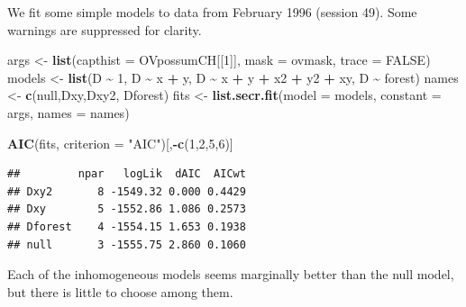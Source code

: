 \documentclass[
]{book}
\newenvironment{Shaded}{\begin{snugshade}}{\end{snugshade}}
\newcommand{\AttributeTok}[1]{\textcolor[rgb]{0.13,0.29,0.53}{#1}}
\newcommand{\ConstantTok}[1]{\textcolor[rgb]{0.56,0.35,0.01}{#1}}
\newcommand{\DecValTok}[1]{\textcolor[rgb]{0.00,0.00,0.81}{#1}}
\newcommand{\FunctionTok}[1]{\textcolor[rgb]{0.13,0.29,0.53}{\textbf{#1}}}
\newcommand{\NormalTok}[1]{#1}
\newcommand{\OtherTok}[1]{\textcolor[rgb]{0.56,0.35,0.01}{#1}}
\newcommand{\SpecialCharTok}[1]{\textcolor[rgb]{0.81,0.36,0.00}{\textbf{#1}}}
\newcommand{\StringTok}[1]{\textcolor[rgb]{0.31,0.60,0.02}{#1}}
\begin{document}
We fit some simple models to data from February 1996 (session 49). Some warnings
are suppressed for clarity.

\begin{Shaded}
\begin{Highlighting}[]
\NormalTok{args }\OtherTok{\textless{}{-}} \FunctionTok{list}\NormalTok{(}\AttributeTok{capthist =}\NormalTok{ OVpossumCH[[}\DecValTok{1}\NormalTok{]], }\AttributeTok{mask =}\NormalTok{ ovmask, }\AttributeTok{trace =} 
    \ConstantTok{FALSE}\NormalTok{)}
\NormalTok{models }\OtherTok{\textless{}{-}} \FunctionTok{list}\NormalTok{(D }\SpecialCharTok{\textasciitilde{}} \DecValTok{1}\NormalTok{, D }\SpecialCharTok{\textasciitilde{}}\NormalTok{ x }\SpecialCharTok{+}\NormalTok{ y, D }\SpecialCharTok{\textasciitilde{}}\NormalTok{ x }\SpecialCharTok{+}\NormalTok{ y }\SpecialCharTok{+}\NormalTok{ x2 }\SpecialCharTok{+}\NormalTok{ y2 }\SpecialCharTok{+}\NormalTok{ xy, }
\NormalTok{    D }\SpecialCharTok{\textasciitilde{}}\NormalTok{ forest)}
\NormalTok{names }\OtherTok{\textless{}{-}} \FunctionTok{c}\NormalTok{(}\StringTok{\textquotesingle{}null\textquotesingle{}}\NormalTok{,}\StringTok{\textquotesingle{}Dxy\textquotesingle{}}\NormalTok{,}\StringTok{\textquotesingle{}Dxy2\textquotesingle{}}\NormalTok{, }\StringTok{\textquotesingle{}Dforest\textquotesingle{}}\NormalTok{)}
\NormalTok{fits }\OtherTok{\textless{}{-}} \FunctionTok{list.secr.fit}\NormalTok{(}\AttributeTok{model =}\NormalTok{ models, }\AttributeTok{constant =}\NormalTok{ args, }
    \AttributeTok{names =}\NormalTok{ names)}
\end{Highlighting}
\end{Shaded}

\begin{Shaded}
\begin{Highlighting}[]
\FunctionTok{AIC}\NormalTok{(fits, }\AttributeTok{criterion =} \StringTok{"AIC"}\NormalTok{)[,}\SpecialCharTok{{-}}\FunctionTok{c}\NormalTok{(}\DecValTok{1}\NormalTok{,}\DecValTok{2}\NormalTok{,}\DecValTok{5}\NormalTok{,}\DecValTok{6}\NormalTok{)]}
\end{Highlighting}
\end{Shaded}

\begin{verbatim}
##         npar   logLik  dAIC  AICwt
## Dxy2       8 -1549.32 0.000 0.4429
## Dxy        5 -1552.86 1.086 0.2573
## Dforest    4 -1554.15 1.653 0.1938
## null       3 -1555.75 2.860 0.1060
\end{verbatim}

Each of the inhomogeneous models seems marginally better than the null model, but there is little to choose among them.
\end{document}
